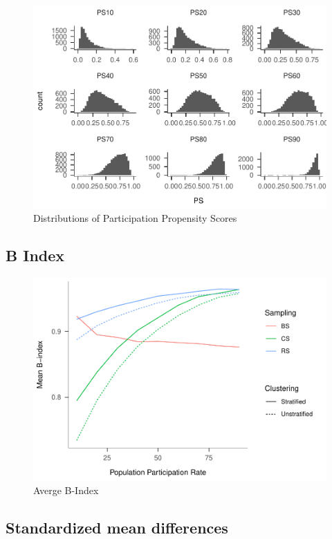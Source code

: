 \documentclass[man,floatsintext]{apa6}
\begin{document}
\begin{figure}
\centering
\includegraphics{Results_files/figure-latex/unnamed-chunk-4-1.pdf}
\caption{\label{fig:unnamed-chunk-4}Distributions of Participation Propensity Scores}
\end{figure}

\hypertarget{b-index}{%
\subsection{B Index}\label{b-index}}

\begin{figure}
\centering
\includegraphics{Results_files/figure-latex/unnamed-chunk-7-1.pdf}
\caption{\label{fig:unnamed-chunk-7}Averge B-Index}
\end{figure}

\hypertarget{standardized-mean-differences}{%
\subsection{Standardized mean differences}\label{standardized-mean-differences}}
\end{document}
